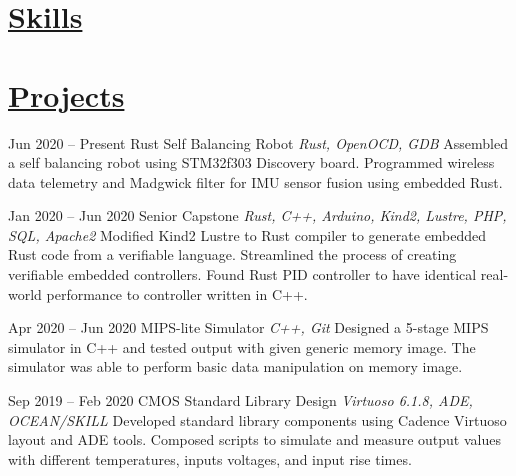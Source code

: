 \documentclass[letterpaper,11pt]{moderncv}        %
\begin{document}
\section{\underline{Skills}}


\section{\underline{Projects}}
\cventry
{Jun 2020 -- Present}
{Rust Self Balancing Robot}
{}
{\textit{Rust, OpenOCD, GDB}}
{}
{Assembled a self balancing robot using STM32f303 Discovery board.  Programmed wireless data telemetry and Madgwick filter for IMU sensor fusion using embedded Rust.\\}


\cventry
{Jan 2020 -- Jun 2020}
{Senior Capstone}
{}
{\textit{Rust, C++, Arduino, Kind2, Lustre, PHP, SQL, Apache2}}
{}
{Modified Kind2 Lustre to Rust compiler to generate embedded Rust code from a verifiable language.  Streamlined the process of creating verifiable embedded controllers.  Found Rust PID controller to have identical real-world performance to controller written in C++.\\}
	

\cventry
{Apr 2020 -- Jun 2020}
{MIPS-lite Simulator}
{}
{\textit{C++, Git}}
{}
{Designed a 5-stage MIPS simulator in C++ and tested output with given generic memory image.  The simulator was able to perform basic data manipulation on memory image.\\}

\cventry
{Sep 2019 -- Feb 2020}
{CMOS Standard Library Design}
{}
{\textit{Virtuoso 6.1.8, ADE, OCEAN/SKILL}}
{}
{Developed standard library components using Cadence Virtuoso layout and ADE tools.  Composed scripts to simulate and measure output values with different temperatures, inputs voltages, and input rise times.\\}	
\end{document}
